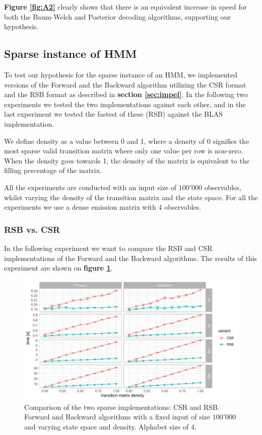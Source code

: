 \textbf{Figure \ref{fig:A2}} clearly shows that there is an equivalent increase in speed for both the Baum-Welch and Posterior decoding algorithms, supporting our hypothesis.

\subsection{Sparse instance of HMM}

To test our hypothesis for the sparse instance of an HMM, we implemented versions of the Forward and the Backward algorithm utilizing the CSR format and the RSB format as described in \textbf{section \ref{sec:impel}}. In the following two experiments we tested the two implementations against each other, and in the last experiment we tested the fastest of these (RSB) against the BLAS implementation.

We define density as a value between 0 and 1, where a density of 0 signifies the most sparse valid transition matrix where only one value per row is non-zero. When the density goes towards 1, the density of the matrix is equivalent to the filling percentage of the matrix. 

All the experiments are conducted with an input size of $100'000$ observables, whilst varying the density of the transition matrix and the state space. For all the experiments we use a dense emission matrix with $4$ observables. 

\subsubsection{RSB vs. CSR}

In the following experiment we want  to compare the RSB and CSR implementations of the Forward and the Backward algorithms. The results of this experiment are shown on \textbf{figure \ref{fig:B3}}. 

\begin{figure}[H]
  \centering
  \includegraphics[scale=0.85]{figures/figure_B3.pdf}
  \caption{\small{Comparison of the two sparse implementations: CSR and RSB. Forward and Backward algorithms with a fixed input of size $100'000$ and varying state space and density. Alphabet size of 4.}}
  \label{fig:B3}
\end{figure}

